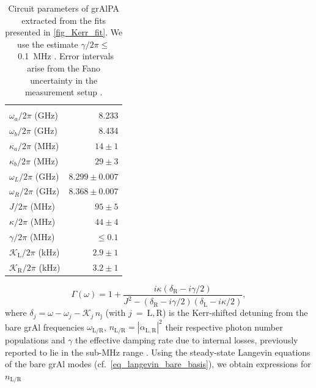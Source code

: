 \documentclass[%
reprint,
floatfix,
superscriptaddress,
amsmath,amssymb,
aps,
pra,
]{revtex4-2}
\begin{document}
\begin{table}[t]
\caption{Circuit parameters of grAlPA extracted from the fits presented in \cref{fig_Kerr_fit}. 
We use the estimate $\gamma/2\pi \leq$~0.1~MHz \cite{Zapata2024Dec}. 
Error intervals arise from the Fano uncertainty in the measurement setup \cite{Rieger2023fano}.}
\label{tab_Circuit_parameters}
\begin{center}
\begin{tabular}{ l | r }
\hline \\[-0.25cm]
 $\omega_a/2\pi$ (GHz) &   8.233 \\[0.12cm]
 $\omega_b/2\pi$ (GHz) &   8.434 \\[0.12cm]
 $\kappa_a/2\pi$ (MHz) &  $14 \pm 1$ \\[0.12cm]
 $\kappa_b/2\pi$ (MHz) &  $29 \pm 3$ \\[0.12cm]
 $\omega_L/2\pi$ (GHz) &  $8.299 \pm 0.007$ \\[0.12cm]
 $\omega_R/2\pi$ (GHz) &  $8.368 \pm 0.007$ \\[0.12cm]
 $J/2\pi$ (MHz)        &  $95 \pm 5$ \\[0.08cm]
 $\kappa/2\pi$ (MHz)   &  $44 \pm 4$ \\[0.08cm]
 $\gamma/2\pi$ (MHz)   &  $\leq 0.1$ \\[0.12cm]
 $\mathcal{K}\mathrm{_L}/2\pi$ (kHz)      &  $2.9 \pm 1$ \\[0.08cm]
 $\mathcal{K}\mathrm{_R}/2\pi$ (kHz)      &  $3.2 \pm 1$ \\[0.08cm]
\hline
\end{tabular}
\end{center}
\end{table}
\begin{equation}
\Gamma\left(\omega\right)=1+\frac{i\kappa\left(\delta\mathrm{_R}-i\gamma/2\right)}{J^2 - \left(\delta\mathrm{_R}-i\gamma/2\right)\left(\delta\mathrm{_L}-i\kappa/2\right)},
\label{eq_Gamma_dimer}
\end{equation}
%
where $\delta_j=\omega-\omega_j-\mathcal{K}_j\,n\mathrm{_{j}}$ (with $j$~=~$\mathrm{L,R}$) is the Kerr-shifted detuning from the bare grAl frequencies $\omega\mathrm{_{L/R}}$, $n\mathrm{_{L/R}}=|\alpha\mathrm{_{L,R}}|^2$ their respective photon number populations and $\gamma$ the effective damping rate due to internal losses, previously reported to lie in the sub-MHz range \cite{Zapata2024Dec}. Using the steady-state Langevin equations of the bare grAl modes (cf.~\cref{eq_langevin_bare_basis}), we obtain expressions for $n\mathrm{_{L/R}}$
\end{document}
